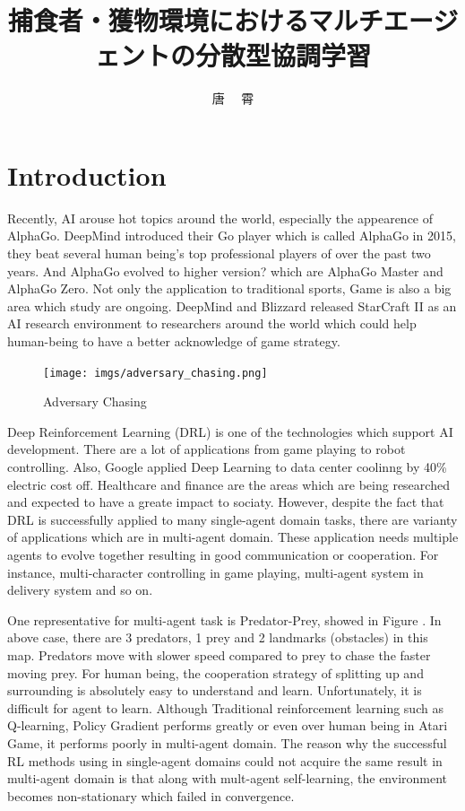 \documentclass[11pt,twocolumn]{jarticle} %
\title{捕食者・獲物環境におけるマルチエージェントの分散型協調学習}
\author{唐 \ \ 霄}
\begin{document}
\maketitle
\thispagestyle{iitheader}
\section{Introduction}
Recently, AI arouse hot topics around the world, especially the appearence of AlphaGo\cite{alphago}. DeepMind introduced their Go player which is called AlphaGo in 2015, they beat several human being's top professional players of over the past two years. And AlphaGo evolved to higher version? which are AlphaGo Master and AlphaGo Zero\cite{alphagozero}. Not only the application to traditional sports, Game is also a big area which study are ongoing. DeepMind and Blizzard released StarCraft II as an AI research environment\cite{starcraft} to researchers around the world which could help human-being to have a better acknowledge of game strategy.\par

\begin{figure}[t]
 \begin{center}
  \texttt{[image: imgs/adversary\_chasing.png]}
  \caption{Adversary Chasing}\label{fig:adversaryChasing}
 \end{center}
\end{figure}

Deep Reinforcement Learning (DRL) is one of the technologies which support AI development. There are a lot of applications from game playing\cite{game} to robot controlling\cite{robot}. Also, Google applied Deep Learning to data center coolinng by 40\%\cite{google} electric cost off. Healthcare and finance are the areas which are being researched and expected to have a greate impact to sociaty. However, despite the fact that DRL is successfully applied to many single-agent domain tasks, there are varianty of applications which are in multi-agent domain. These application needs multiple agents to evolve together resulting in good communication or cooperation. For instance, multi-character controlling in game playing, multi-agent system in delivery system and so on.


One representative for multi-agent task is Predator-Prey\cite{maddpg}, showed in Figure \label{fig:adversaryChasing}. In above case, there are 3 predators, 1 prey and 2 landmarks (obstacles) in this map. Predators move with slower speed compared to prey to chase the faster moving prey. For human being, the cooperation strategy of splitting up and surrounding is absolutely easy to understand and learn. Unfortunately, it is difficult for agent to learn. Although Traditional reinforcement learning such as Q-learning\cite{qlearning}, Policy Gradient\cite{pg} performs greatly or even over human being in Atari Game\cite{ddpg}, it performs poorly in multi-agent domain. The reason why the successful RL methods using in single-agent domains could not acquire the same result in multi-agent domain is that along with mult-agent self-learning, the environment becomes non-stationary which failed in convergence. \par
\end{document}

